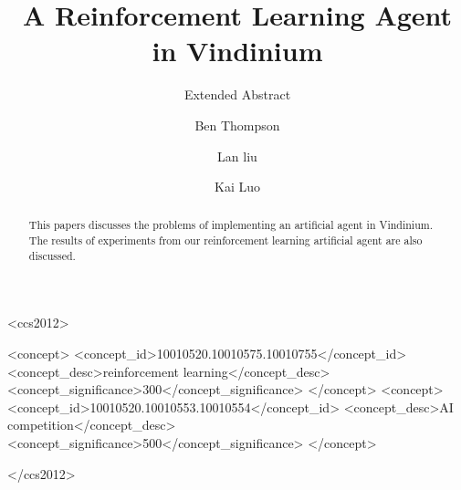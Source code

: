 \documentclass[siggraph, review=false]{acmart}
\begin{document}
\title{A Reinforcement Learning Agent in Vindinium}
\subtitle{Extended Abstract}


\author{Ben Thompson}

\author{Lan liu}
\author{Kai Luo}




\renewcommand{\shortauthors}{B. Trovato et al.}

\begin{abstract}
This papers discusses the problems of implementing an artificial
agent in Vindinium. The results of experiments from our reinforcement learning artificial agent are also discussed.
\end{abstract}

%
%
\begin{CCSXML}
<ccs2012>

 <concept>
  <concept_id>10010520.10010575.10010755</concept_id>
  <concept_desc>reinforcement learning</concept_desc>
  <concept_significance>300</concept_significance>
 </concept>
 <concept>
  <concept_id>10010520.10010553.10010554</concept_id>
  <concept_desc>AI competition</concept_desc>
  <concept_significance>500</concept_significance>
 </concept>
 
</ccs2012>  



\end{CCSXML}


\end{document}
